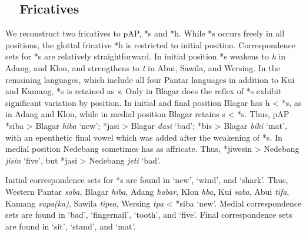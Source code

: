 \subsection[\ \ Fricatives]{\ \ Fricatives}
\hypertarget{RefHeading49919871885726}{}We reconstruct two fricatives to pAP, *s and *h. While *s occurs freely in all positions, the glottal fricative *h is restricted to initial position. Correspondence sets for *s are relatively straightforward. In initial position *s weakens to \textit{h} in Adang, and Klon, and strengthens to \textit{t} in Abui, Sawila, and Wersing. In the remaining languages, which include all four Pantar languages in addition to Kui and Kamang, *s is retained as \textit{s}. Only in Blagar does the reflex of *s exhibit significant variation by position. In initial and final position Blagar has h {\textless} *s, as in Adang and Klon, while in medial position Blagar retains s {\textless} *s. Thus, pAP *siba {\textgreater} Blagar \textit{hiba }{\textquoteleft}new{\textquoteright}; *jasi {\textgreater} Blagar \textit{d{\textyogh}asi }{\textquoteleft}bad{\textquoteright}; *bis {\textgreater} Blagar \textit{bihi} {\textquoteleft}mat{\textquoteright}, with an epenthetic final vowel which was 
added after the weakening of *s. In medial position Nedebang sometimes has as affricate. Thus, *jiwesin {\textgreater} Nedebang \textit{jisin }{\textquoteleft}five{\textquoteright}, but *jasi {\textgreater} Nedebang \textit{jet{\textesh}i} {\textquoteleft}bad{\textquoteright}. 

Initial correspondence sets for *s are found in {\textquoteleft}new{\textquoteright}, {\textquoteleft}wind{\textquoteright}, and {\textquoteleft}shark{\textquoteright}. Thus, Western Pantar \textit{sab{\textlengthmark}a}, Blagar\textit{ hiba}, Adang \textit{habar}, Klon \textit{h{\textschwa}ba}, Kui \textit{saba}, Abui \textit{tifa}, Kamang \textit{supa(ka)}, Sawila \textit{tipea}, Wersing \textit{t{\textschwa}pa }{\textless} *siba {\textquoteleft}new{\textquoteright}. Medial correspondence sets are found in {\textquoteleft}bad{\textquoteright}, {\textquoteleft}fingernail{\textquoteright}, {\textquoteleft}tooth{\textquoteright}, and {\textquoteleft}five{\textquoteright}. Final correspondence sets are found in {\textquoteleft}sit{\textquoteright}, {\textquoteleft}stand{\textquoteright}, and {\textquoteleft}mat{\textquoteright}. 

